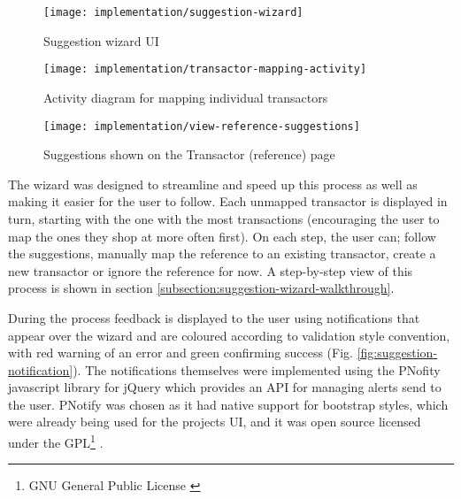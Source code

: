\begin{figure}[h]
    \centering
    \texttt{[image: implementation/suggestion-wizard]}
    \caption[Suggestion wizard UI]{Suggestion wizard UI\protect\footnotemark}
    \label{fig:suggestion-wizard}
\end{figure}

\begin{figure}[h]
    \centering
    \texttt{[image: implementation/transactor-mapping-activity]}
    \caption{Activity diagram for mapping individual transactors}
    \label{fig:transactor-mapping-activity}
    
    \begin{comment}
(start)->(Open Statement)->(Search Statement)-><a>->(end)
<a>->(Open Transactor)->(Map Transactor)->(Open Statement)
    \end{comment}
\end{figure}

\begin{figure}[h]
    \centering
    \texttt{[image: implementation/view-reference-suggestions]}
    \caption{Suggestions shown on the Transactor (reference) page}
    \label{fig:view-reference-suggestions}
\end{figure}

The wizard was designed to streamline and speed up this process as well as making it easier for the user to follow. Each unmapped transactor is displayed in turn, starting with the one with the most transactions (encouraging the user to map the ones they shop at more often first). On each step, the user can; follow the suggestions, manually map the reference to an existing transactor, create a new transactor or ignore the reference for now. A step-by-step view of this process is shown in section \ref{subsection:suggestion-wizard-walkthrough}.

During the process feedback is displayed to the user using notifications that appear over the wizard and are coloured according to validation style convention, with red warning of an error and green confirming success (Fig. \ref{fig:suggestion-notification}). 
%
The notifications themselves were implemented using the PNofity javascript library for jQuery which provides an API for managing alerts send to the user. PNotify was chosen as it had native support for bootstrap styles, which were already being used for the projects UI, and it was open source licensed under the GPL\footnote{GNU General Public License \parencite{gnu2007license}} \parencite{huber2014potify}.

